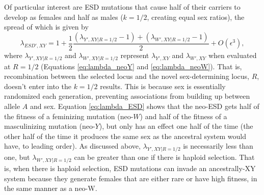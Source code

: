 \documentclass[12pt]{article}
\begin{document}
Of particular interest are ESD mutations that cause half of their carriers to develop as females and half as males ($k=1/2$, creating equal sex ratios), the spread of which is given by
\begin{equation}
\lambda_{ESD',XY} =1+ \frac{1}{2}\frac{(\lambda_{Y',XY\rvert R=1/2}-1) + (\lambda_{W',XY\rvert R=1/2}-1)}{2} + O\left(\epsilon^3\right),
\label{eq:lambda_ESD}
\end{equation}
\noindent
where $\lambda_{Y',XY\rvert R=1/2}$ and $\lambda_{W',XY\rvert R=1/2}$ represent $\lambda_{Y',XY}$ and $\lambda_{W',XY}$ when evaluated at $R=1/2$ (Equations \ref{eq:lambda_neoY} and \ref{eq:lambda_neoW}).
That is, recombination between the selected locus and the novel sex-determining locus, $R$, doesn't enter into the $k=1/2$ results.
This is because sex is essentially randomized each generation, %
preventing associations from building up between allele $A$ and sex. 
Equation \eqref{eq:lambda_ESD} shows that the neo-ESD gets half of the fitness of a feminizing mutation (neo-$W$) and half of the fitness of a masculinizing mutation (neo-$Y$), but only has an effect one half of the time (the other half of the time it produces the same sex as the ancestral system would have, to leading order). 
As discussed above, $\lambda_{Y',XY\rvert R=1/2}$ is necessarily less than one, but $\lambda_{W',XY\rvert R=1/2}$ can be greater than one if there is haploid selection.
That is, when there is haploid selection, ESD mutations can invade an ancestrally-XY system because they generate females that are either rare or have high fitness, in the same manner as a neo-W. 
\end{document}
